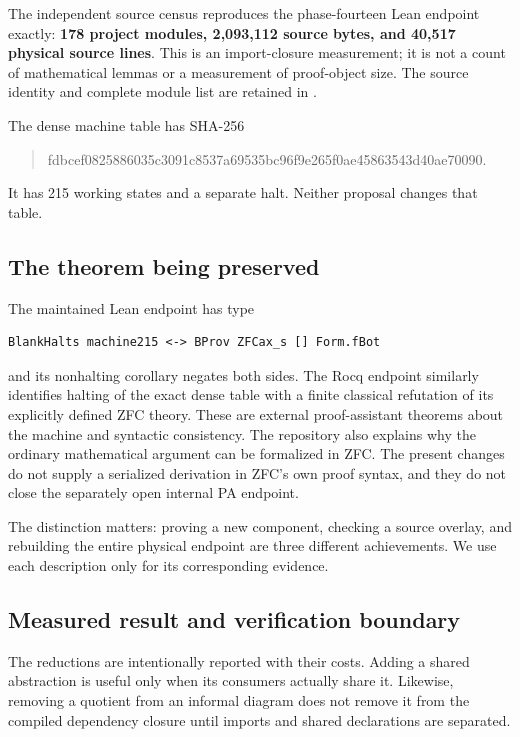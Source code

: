 \documentclass[11pt,letterpaper]{article}
\theoremstyle{definition}
\theoremstyle{remark}
\newcommand{\code}[1]{\texttt{\detokenize{#1}}}
\begin{document}
The independent source census reproduces the phase-fourteen Lean endpoint exactly:
\textbf{178 project modules, 2,093,112 source bytes, and 40,517 physical source
lines}. This is an import-closure measurement; it is not a count of mathematical
lemmas or a measurement of proof-object size. The source identity and complete
module list are retained in \code{evidence/baseline-lean-closure.json}.

The dense machine table has SHA-256
\begin{quote}\small\ttfamily
fdbcef0825886035c3091c8537a69535bc96f9e265f0ae45863543d40ae70090.
\end{quote}
It has 215 working states and a separate halt. Neither proposal changes that table.

\subsection{The theorem being preserved}

The maintained Lean endpoint has type
\begin{lstlisting}
BlankHalts machine215 <-> BProv ZFCax_s [] Form.fBot
\end{lstlisting}
and its nonhalting corollary negates both sides. The Rocq endpoint similarly
identifies halting of the exact dense table with a finite classical refutation of
its explicitly defined ZFC theory. These are external proof-assistant theorems
about the machine and syntactic consistency. The repository also explains why the
ordinary mathematical argument can be formalized in ZFC. The present changes do
not supply a serialized derivation in ZFC's own proof syntax, and they do not close
the separately open internal PA endpoint.

The distinction matters: proving a new component, checking a source overlay, and
rebuilding the entire physical endpoint are three different achievements. We use
each description only for its corresponding evidence.

\subsection{Measured result and verification boundary}



The reductions are intentionally reported with their costs. Adding a shared
abstraction is useful only when its consumers actually share it. Likewise,
removing a quotient from an informal diagram does not remove it from the
compiled dependency closure until imports and shared declarations are separated.
\end{document}
